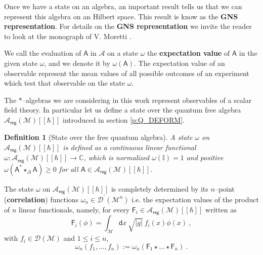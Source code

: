 \documentclass[11pt]{book}
\newcommand{\reg}{\mathsf{reg}}
\newcommand{\abs}[1]{\left|#1\right|}
\newcommand{\Acal}{\mathcal{A}}
\newcommand{\Dcal}{\mathcal{D}}
\newcommand{\Mcal}{\mathcal{M}}
\newcommand{\Cbb}{\mathbb{C}}
\newcommand{\Ibb}{\mathbb{I}}
\newcommand{\Asf}{\mathsf{A}}
\newcommand{\Fsf}{\mathsf{F}}
\newcommand{\dsf}{\mathsf{d}}
\theoremstyle{break}
\newtheorem{definition}{Definition}[chapter]
\begin{document}
Once we have a state on an algebra, an important result tells us that we can represent this algebra on an Hilbert space. This result is know as the \textbf{GNS representation}. For details on the \textbf{GNS representation} we invite the reader to look at the monograph of V. Moretti \cite{MORETTI_2013}.


\bigskip


We call the evaluation of $\Asf$ in $\Acal$ on a state $\omega$ the \textbf{expectation value} of $\Asf$ in the given state $\omega$, and we denote it by $\omega(\Asf)$. The expectation value of an observable represent the mean values of all possible outcomes of an experiment which test that observable on the state $\omega$.


\bigskip


The $\ast$--algebras we are considering in this work represent observables of a scalar field theory. In particular let us define a state over the quantum free algebra $\Acal_\reg(\Mcal)[[\hbar]]$ introduced in section \ref{p:Q_DEFORM}.


\begin{definition}[State over the free quantum algebra]
A state $\omega$ on $\Acal_\reg(\Mcal)[[\hbar]]$ is defined as a continuous linear functional $\omega : \Acal_\reg(\Mcal)[[\hbar]] \to \Cbb$, which is normalized $\omega(\Ibb)=1$ and positive $\omega(\Asf^\ast \star_\Delta \Asf) \geq 0$ for all $\Asf \in \Acal_\reg(\Mcal)[[\hbar]]$.
\end{definition}


The state $\omega$ on $\Acal_\reg(\Mcal)[[\hbar]]$ is completely determined by its $n$--point (\textbf{correlation}) functions $\omega_n \in \Dcal^\prime(\Mcal^n)$ i.e. the expectation values of the product of $n$ linear functionals, namely, for every $\Fsf_i\in \Acal_\reg(\Mcal)[[\hbar]]$ written as
%
\begin{equation*}
\Fsf_i(\phi) = \int_\Mcal \dsf x \ \sqrt{\abs{g}} \ f_i(x) \phi(x) \ , 
\end{equation*}
%
with $f_i \in \Dcal(\Mcal)$ and $1 \leq i \leq n$,
%
\begin{equation*}
\omega_n(f_1, \dots , f_n) := \omega_n(\Fsf_1 \star \dots \star \Fsf_n) \ .
\end{equation*}
\end{document}
